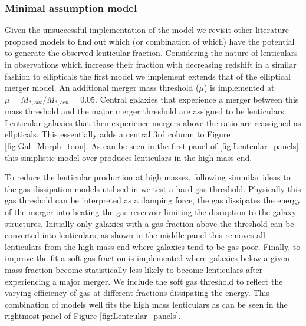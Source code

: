 \subsubsection{Minimal assumption model}

Given the unsuccessful implementation of the \citet{Cook2009Two-phaseFormation} model we revisit other literature proposed models to find out which (or combination of which) have the potential to generate the observed lenticular fraction. Considering the nature of lenticulars in observations which increase their fraction with decreasing redshift in a similar fashion to ellipticals the first model we implement extends that of the elliptical merger model. An additional merger mass threshold ($\mu$) is implemented at $\mu = M_{*, sat}/M_{*, cen} = 0.05$. Central galaxies that experience a merger between this mass threshold and the major merger threshold are assigned to be lenticulars. Lenticular galaxies that then experience mergers above the ratio are reassigned as ellpticals. This essentially adds a central 3rd column to Figure \ref{fig:Gal_Morph_toon}. As can be seen in the first panel of \ref{fig:Lentcular_panels} this simplistic model over produces lenticulars in the high mass end. 

To reduce the lenticular production at high masses, following simmilar ideas to the gas dissipation models utilised in \citet{Hopkins2009} we test a hard gas threshold. Physically this gas threshold can be interpreted as a damping force, the gas dissipates the energy of the merger into heating the gas reservoir limiting the disruption to the galaxy structures. Initially only galaxies with a gas fraction above the threshold can be converted into lenticulars, as shown in the middle panel this removes all lenticulars from the high mass end where galaxies tend to be gas poor. 
Finally, to improve the fit a soft gas fraction is implemented where galaxies below a given mass fraction become statistically less likely to become lenticulars after experiencing a major merger. We include the soft gas threshold to reflect the varying efficiency of gas at different fractions dissipating the energy. This combination of models well fits the high mass lenticulars as can be seen in the rightmost panel of Figure \ref{fig:Lentcular_panels}.

